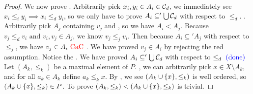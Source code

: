 \documentclass{report}
\begin{document}
\begin{proof}
We now prove  . Arbitrarily pick $x_i,y_i\in A_i\in \mathcal{C}_d$,  we immediately see $x_i\leq _iy_i\implies x_i\leq _dy_i$, so we only have to prove $A_i\subseteq' \bigcup \mathcal{C}_d$ with respect to $\leq _d$. . Arbitrarily pick $A_j$ containing  $v_j$ and  , so we have $A_i<A_j$. Because $v_j\leq_d v_i\text{ and }v_i,v_j\in A_j$, we know $v_j\leq _jv_i$. Then because $A_i\subseteq' A_j$ with respect to $\leq _j$, we have $v_j\in A_i\text{ \textcolor{red}{CaC} }$. We have proved $v_j\in A_i$ by rejecting the red assumption. Notice the . We have proved $A_i\subseteq' \bigcup \mathcal{C}_d$ with respect to $\leq _d\textcolor{blue}{\text{ (done) }}$\\

Let $(A_k,\leq _k)$ be a maximal element of $P$.  , we can arbitrarily pick $x\in X\setminus A_k$, and for all $a_k\in A_k$ define $a_k\leq_k x$. By , we see $(A_k\cup \{ x \},\leq _k)$ is well ordered, so $(A_k\cup \{ x \},\leq _k)\in P$. To prove $(A_k,\leq _k)<(A_k\cup \{ x \},\leq _k)$ is trivial. \CaC
\end{proof}
\end{document}
